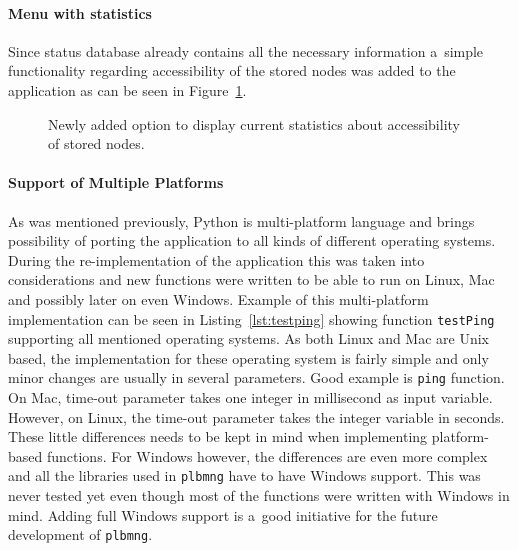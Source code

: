 {{{{{{\paragraph{Menu with statistics}
Since status database already contains all the necessary information a~simple functionality regarding accessibility of the stored nodes was added to the application as can be seen in Figure~\ref{fig:statmenu}. 

\begin{figure}[H]
	\centering
	\caption{Newly added option to display current statistics about accessibility of stored nodes.}
	\label{fig:statmenu}
\end{figure}

\paragraph{Support of Multiple Platforms}
As was mentioned previously, Python is multi-platform language and brings possibility of porting the application to all kinds of different operating systems. During the re-implementation of the application this was taken into considerations and new functions were written to be able to run on Linux, Mac and possibly later on even Windows. Example of this multi-platform implementation can be seen in Listing~\ref{lst:testping} showing function \texttt{testPing} supporting all mentioned operating systems. As both Linux and Mac are Unix based, the implementation for these operating system is fairly simple and only minor changes are usually in several parameters. Good example is \texttt{ping} function. On Mac, time-out parameter takes one integer in millisecond as input variable. However, on Linux, the time-out parameter takes the integer variable in seconds. These little differences needs to be kept in mind when implementing platform-based functions. For Windows however, the differences are even more complex and all the libraries used in \texttt{plbmng} have to have Windows support. This was never tested yet even though most of the functions were written with Windows in mind. Adding full Windows support is a~good initiative for the future development of \texttt{plbmng}.

}}}}}}
